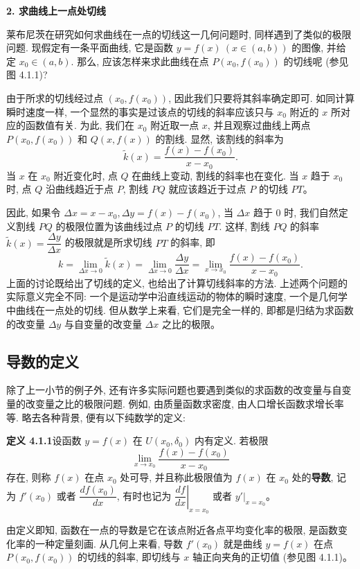 \documentclass[UTF8,12pt,a4paper,fontset=fandol]{ctexart}
\begin{document}
\noindent\textbf{2. 求曲线上一点处切线}

莱布尼茨在研究如何求曲线在一点的切线这一几何问题时, 同样遇到了类似的极限问题. 现假定有一条平面曲线, 它是函数 $y=f(x)\ (x\in(a,b))$ 的图像, 并给定 $x_0\in(a,b)$. 那么, 应该怎样来求此曲线在点 $P(x_0,f(x_0))$ 的切线呢 (参见图 4.1.1)?

由于所求的切线经过点 $(x_0,f(x_0))$, 因此我们只要将其斜率确定即可. 如同计算瞬时速度一样, 一个显然的事实是过该点的切线的斜率应该只与 $x_0$ 附近的 $x$ 所对应的函数值有关. 为此, 我们在 $x_0$ 附近取一点 $x$, 并且观察过曲线上两点 $P(x_0,f(x_0))$ 和 $Q(x,f(x))$ 的割线. 显然, 该割线的斜率为
\[
  \tilde{k}(x)=\frac{f(x)-f(x_0)}{x-x_0}.
\]
当 $x$ 在 $x_0$ 附近变化时, 点 $Q$ 在曲线上变动, 割线的斜率也在变化. 当 $x$ 趋于 $x_0$ 时, 点 $Q$ 沿曲线趋近于点 $P$, 割线 $PQ$ 就应该趋近于过点 $P$ 的切线 $PT$。

因此, 如果令 $\Delta x=x-x_0,\Delta y=f(x)-f(x_0)$, 当 $\Delta x$ 趋于 $0$ 时, 我们自然定义割线 $PQ$ 的极限位置为该曲线过点 $P$ 的切线 $PT$. 这样, 割线 $PQ$ 的斜率 $\tilde{k}(x)=\dfrac{\Delta y}{\Delta x}$ 的极限就是所求切线 $PT$ 的斜率, 即
\[
  k=
  \lim_{\Delta x\to0}\tilde{k}(x)
  =
  \lim_{\Delta x\to0}\frac{\Delta y}{\Delta x}
  =
  \lim_{x\to x_0}\frac{f(x)-f(x_0)}{x-x_0}.
\]
上面的讨论既给出了切线的定义, 也给出了计算切线斜率的方法. 上述两个问题的实际意义完全不同: 一个是运动学中沿直线运动的物体的瞬时速度, 一个是几何学中曲线在一点处的切线. 但从数学上来看, 它们是完全一样的, 即都是归结为求函数的改变量 $\Delta y$ 与自变量的改变量 $\Delta x$ 之比的极限。

\subsection{导数的定义}

除了上一小节的例子外, 还有许多实际问题也要遇到类似的求函数的改变量与自变量的改变量之比的极限问题. 例如, 由质量函数求密度, 由人口增长函数求增长率等. 略去各种背景, 便有以下纯数学的定义:

\noindent\textbf{定义 4.1.1}\quad 设函数 $y=f(x)$ 在 $U(x_0,\delta_0)$ 内有定义. 若极限
\[
  \lim_{x\to x_0}\frac{f(x)-f(x_0)}{x-x_0}
\]
存在, 则称 $f(x)$ 在点 $x_0$ 处可导, 并且称此极限值为 $f(x)$ 在 $x_0$ 处的\textbf{导数}, 记为 $f'(x_0)$ 或者 $\dfrac{df(x_0)}{dx}$, 有时也记为 $\left.\dfrac{df}{dx}\right|_{x=x_0}$ 或者 $\left.y'\right|_{x=x_0}$。

由定义即知, 函数在一点的导数是它在该点附近各点平均变化率的极限, 是函数变化率的一种定量刻画. 从几何上来看, 导数 $f'(x_0)$ 就是曲线 $y=f(x)$ 在点 $P(x_0,f(x_0))$ 的切线的斜率, 即切线与 $x$ 轴正向夹角的正切值 (参见图 4.1.1)。
\end{document}
